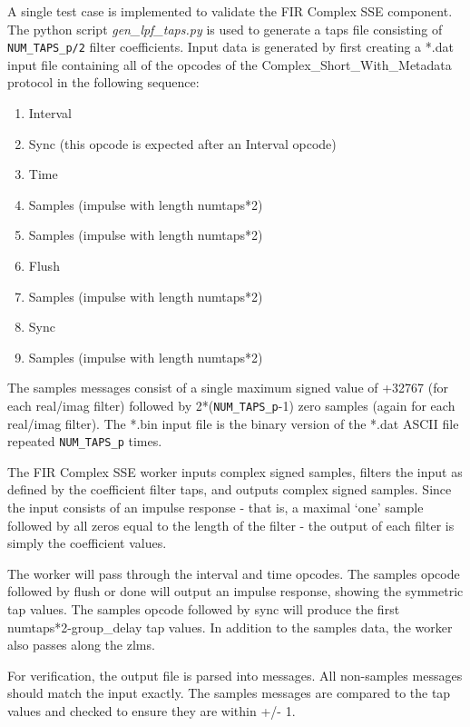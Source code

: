 \begin{flushleft}
A single test case is implemented to validate the FIR Complex SSE component. The python script \textit{gen\_lpf\_taps.py} is used to generate a taps file consisting of \verb+NUM_TAPS_p/2+ filter coefficients. Input data is generated by first creating a *.dat input file containing all of the opcodes of the Complex\_Short\_With\_Metadata protocol in the following sequence:
\begin{enumerate}
	\item Interval
	\item Sync (this opcode is expected after an Interval opcode)
	\item Time
	\item Samples (impulse with length numtaps*2)
	\item Samples (impulse with length numtaps*2)
	\item Flush	
	\item Samples (impulse with length numtaps*2)
	\item Sync
	\item Samples (impulse with length numtaps*2)
\end{enumerate}

The samples messages consist of a single maximum signed value of +32767 (for each real/imag filter) followed by 2*(\verb+NUM_TAPS_p+-1) zero samples (again for each real/imag filter). The *.bin input file is the binary version of the *.dat ASCII file repeated \verb+NUM_TAPS_p+ times.\medskip

The FIR Complex SSE worker inputs complex signed samples, filters the input as defined by the coefficient filter taps, and outputs complex signed samples. Since the input consists of an impulse response - that is, a maximal `one' sample followed by all zeros equal to the length of the filter - the output of each filter is simply the coefficient values.\medskip

The worker will pass through the interval and time opcodes. The samples opcode followed by flush or done will output an impulse response, showing the symmetric tap values. The samples opcode followed by sync will produce the first numtaps*2-group\_delay tap values. In addition to the samples data, the worker also passes along the zlms.\medskip

For verification, the output file is parsed into messages. All non-samples messages should match the input exactly. The samples messages are compared to the tap values and checked to ensure they are within +/- 1. 
\end{flushleft}

